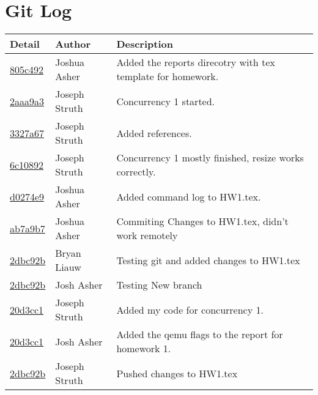 \documentclass[10pt,draftclsnofoot,onecolumn, compsoc]{IEEEtran}
\begin{document}
\section{Git Log}
\begin{tabular}{| l | l | p{15cm} |}\textbf{Detail} & \textbf{Author} & \textbf{Description}\\\hline
\href{ssh://asherj@os-class.engr.oregonstate.edu/scratch/spring2017/13-03/commit/805c492e98007c3a790adbf9a93510e3d1554b9e}{805c492} & Joshua Asher & Added the reports direcotry with tex template for homework.\\\hline
\href{https://github.com/struthj/CS444/commit/2aaa9a33b6a922d936a45512e0bffbca55d9d4f2}{2aaa9a3} & Joseph Struth & Concurrency 1 started.\\\hline
\href{https://github.com/struthj/CS444/commit/3327a672e51047c431ab8a26d943fffddae5094d}{3327a67} & Joseph Struth & Added references.\\\hline
\href{https://github.com/struthj/CS444/commit/6c10892626887f58e4adbe5eb75aba47de8fc502}{6c10892} & Joseph Struth & Concurrency 1 mostly finished, resize works correctly.\\\hline
\href{ssh://asherj@os-class.engr.oregonstate.edu/scratch/spring2017/13-03/commit/d0274e9f69f9eaf63240fb412118aa80ac17c95c}{d0274e9} & Joshua Asher & Added command log to HW1.tex.\\\hline
\href{ssh://asherj@os-class.engr.oregonstate.edu/scratch/spring2017/13-03/commit/ab7a9b7f1f030f5833b1f23f416d8fab0e95cb72}{ab7a9b7} & Joshua Asher & Commiting Changes to HW1.tex, didn't work remotely\\\hline
\href{ssh://liauwb@os-class.engr.oregonstate.edu/scratch/spring2017/13-03/commit/be8839aa4b12089b34597dbc92bb1d5bdab577f}{2dbc92b} & Bryan Liauw & Testing git and added changes to HW1.tex\\\hline
\href{ssh://asherj@os-class.engr.oregonstate.edu/scratch/spring2017/13-03/commit/2dbc92bb1d5bd13fe53785d348475ffe2e21c7e8}{2dbc92b} & Josh Asher & Testing New branch\\\hline
\href{ssh://struthj@os-class.engr.oregonstate.edu/scratch/spring2017/13-03/commit/b67dfc110164531a41258d3b958b7baf59fda87}{20d3cc1} & Joseph Struth & Added my code for concurrency 1.\\\hline
\href{ssh://asherj@os-class.engr.oregonstate.edu/scratch/spring2017/13-03/commit/20d3cc110164531a41258d3b958b7baf59d0b38a}{20d3cc1} & Josh Asher & Added the qemu flags to the report for homework 1.\\
\href{ssh://struthj@os-class.engr.oregonstate.edu/scratch/spring2017/13-03/commit/7dbc92bb1d5bdab577fbe8839aa4b12089b3459}{2dbc92b} & Joseph Struth & Pushed changes to HW1.tex\\\hline

\end{tabular}
\end{document}
